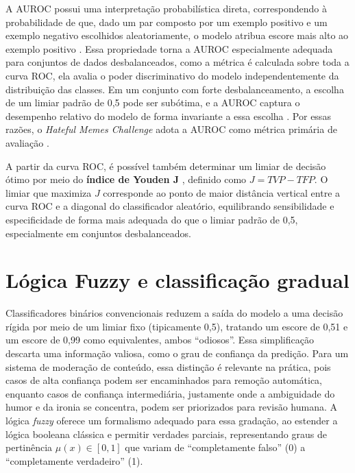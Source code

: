 A AUROC possui uma interpretação probabilística direta, correspondendo à probabilidade de que, dado um par composto por um exemplo positivo e um exemplo negativo escolhidos aleatoriamente, o modelo atribua escore mais alto ao exemplo positivo \cite{fawcett2006}. Essa propriedade torna a AUROC especialmente adequada para conjuntos de dados desbalanceados, como a métrica é calculada sobre toda a curva ROC, ela avalia o poder discriminativo do modelo independentemente da distribuição das classes. Em um conjunto com forte desbalanceamento, a escolha de um limiar padrão de 0,5 pode ser subótima, e a AUROC captura o desempenho relativo do modelo de forma invariante a essa escolha \cite{he2009}. Por essas razões, o \textit{Hateful Memes Challenge} adota a AUROC como métrica primária de avaliação \cite{ArticleHatefulMemesChallenge2020}.

A partir da curva ROC, é possível também determinar um limiar de decisão ótimo por meio do \textbf{índice de Youden J} \cite{youden1950}, definido como $J = TVP - TFP$. O limiar que maximiza $J$ corresponde ao ponto de maior distância vertical entre a curva ROC e a diagonal do classificador aleatório, equilibrando sensibilidade e especificidade de forma mais adequada do que o limiar padrão de 0,5, especialmente em conjuntos desbalanceados.

\section{Lógica Fuzzy e classificação gradual}

Classificadores binários convencionais reduzem a saída do modelo a uma 
decisão rígida por meio de um limiar fixo (tipicamente 0,5), tratando um 
escore de 0,51 e um escore de 0,99 como equivalentes, ambos ``odiosos''. Essa 
simplificação descarta uma informação valiosa, como o grau de confiança da 
predição. Para um sistema de moderação de conteúdo, essa distinção é 
relevante na prática, pois casos de alta confiança podem ser encaminhados 
para remoção automática, enquanto casos de confiança intermediária, 
justamente onde a ambiguidade do humor e da ironia se concentra, podem ser 
priorizados para revisão humana. A lógica \textit{fuzzy} \cite{Zadeh1965} 
oferece um formalismo adequado para essa gradação, ao estender a lógica 
booleana clássica e permitir verdades parciais, representando graus de 
pertinência $\mu(x) \in [0,1]$ que variam de ``completamente falso'' (0) a 
``completamente verdadeiro'' (1).

